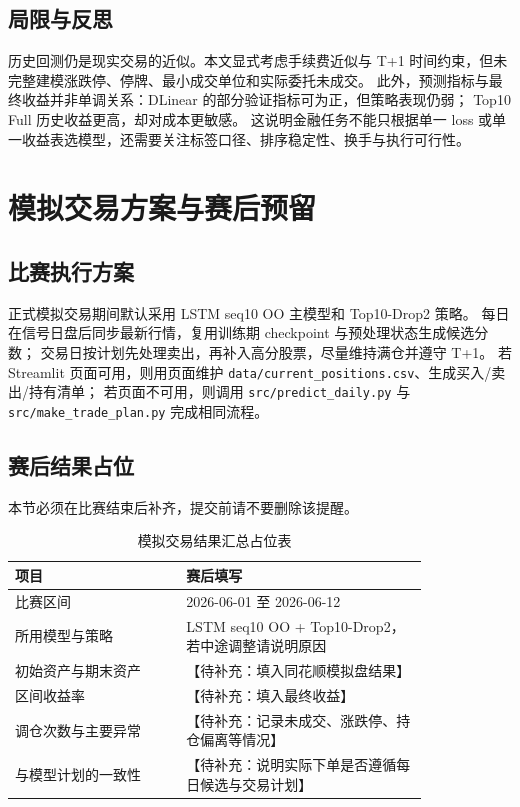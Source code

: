 \documentclass[UTF8,a4paper,11pt]{ctexart}
\newcommand{\todo}[1]{\textcolor{red!70!black}{【待补充：#1】}}
\begin{document}
\subsection{局限与反思}

历史回测仍是现实交易的近似。本文显式考虑手续费近似与 T+1 时间约束，但未完整建模涨跌停、停牌、最小成交单位和实际委托未成交。
此外，预测指标与最终收益并非单调关系：DLinear 的部分验证指标可为正，但策略表现仍弱；
Top10 Full 历史收益更高，却对成本更敏感。
这说明金融任务不能只根据单一 loss 或单一收益表选模型，还需要关注标签口径、排序稳定性、换手与执行可行性。

\section{模拟交易方案与赛后预留}\label{sec:simulation}

\subsection{比赛执行方案}

正式模拟交易期间默认采用 LSTM seq10 OO 主模型和 Top10-Drop2 策略。
每日在信号日盘后同步最新行情，复用训练期 checkpoint 与预处理状态生成候选分数；
交易日按计划先处理卖出，再补入高分股票，尽量维持满仓并遵守 T+1。
若 Streamlit 页面可用，则用页面维护 \texttt{data/current\_positions.csv}、生成买入/卖出/持有清单；
若页面不可用，则调用 \texttt{src/predict\_daily.py} 与 \texttt{src/make\_trade\_plan.py} 完成相同流程。

\subsection{赛后结果占位}

本节必须在比赛结束后补齐，提交前请不要删除该提醒。

\begin{table}[H]
\centering
\caption{模拟交易结果汇总占位表}
\begin{tabular}{p{0.34\linewidth}p{0.48\linewidth}}
\toprule
项目 & 赛后填写 \\
\midrule
比赛区间 & 2026-06-01 至 2026-06-12 \\
所用模型与策略 & LSTM seq10 OO + Top10-Drop2，若中途调整请说明原因 \\
初始资产与期末资产 & \todo{填入同花顺模拟盘结果} \\
区间收益率 & \todo{填入最终收益} \\
调仓次数与主要异常 & \todo{记录未成交、涨跌停、持仓偏离等情况} \\
与模型计划的一致性 & \todo{说明实际下单是否遵循每日候选与交易计划} \\
\bottomrule
\end{tabular}
\end{table}
\end{document}
